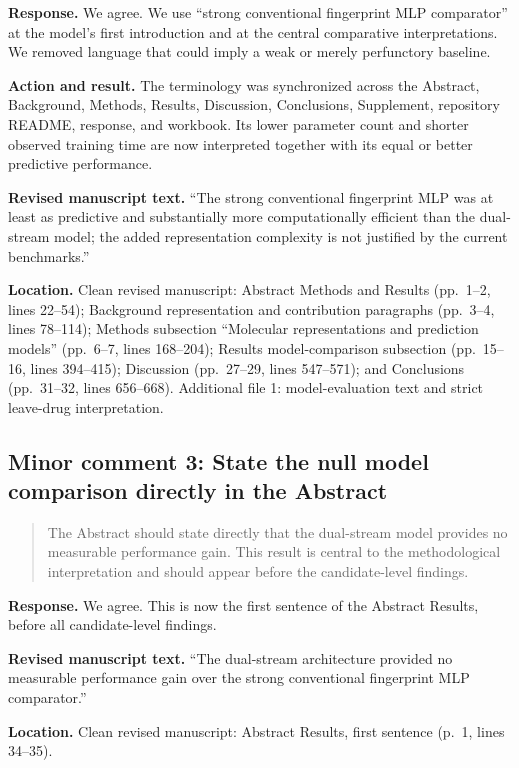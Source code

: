 \documentclass[10pt]{article}
\newenvironment{reviewcomment}{%
  \begin{quote}\small\itshape\color{black}
}{\end{quote}}
\newcommand{\Response}{\textbf{Response.} }
\newcommand{\Action}{\textbf{Action and result.} }
\newcommand{\RevisedText}{\textbf{Revised manuscript text.} }
\newcommand{\Location}{\textbf{Location.} }
\newcommand{\qtext}[1]{``#1''}
\begin{document}
\Response We agree. We use \qtext{strong conventional fingerprint MLP comparator} at the model's first introduction and at the central comparative interpretations. We removed language that could imply a weak or merely perfunctory baseline.

\Action The terminology was synchronized across the Abstract, Background, Methods, Results, Discussion, Conclusions, Supplement, repository README, response, and workbook. Its lower parameter count and shorter observed training time are now interpreted together with its equal or better predictive performance.

\RevisedText \qtext{The strong conventional fingerprint MLP was at least as predictive and substantially more computationally efficient than the dual-stream model; the added representation complexity is not justified by the current benchmarks.}

\Location Clean revised manuscript: Abstract Methods and Results (pp.~1--2, lines 22--54); Background representation and contribution paragraphs (pp.~3--4, lines 78--114); Methods subsection ``Molecular representations and prediction models'' (pp.~6--7, lines 168--204); Results model-comparison subsection (pp.~15--16, lines 394--415); Discussion (pp.~27--29, lines 547--571); and Conclusions (pp.~31--32, lines 656--668). Additional file 1: model-evaluation text and strict leave-drug interpretation.

\subsection*{Minor comment 3: State the null model comparison directly in the Abstract}

\begin{reviewcomment}
The Abstract should state directly that the dual-stream model provides no measurable performance gain. This result is central to the methodological interpretation and should appear before the candidate-level findings.
\end{reviewcomment}

\Response We agree. This is now the first sentence of the Abstract Results, before all candidate-level findings.

\RevisedText \qtext{The dual-stream architecture provided no measurable performance gain over the strong conventional fingerprint MLP comparator.}

\Location Clean revised manuscript: Abstract Results, first sentence (p.~1, lines 34--35).
\end{document}
